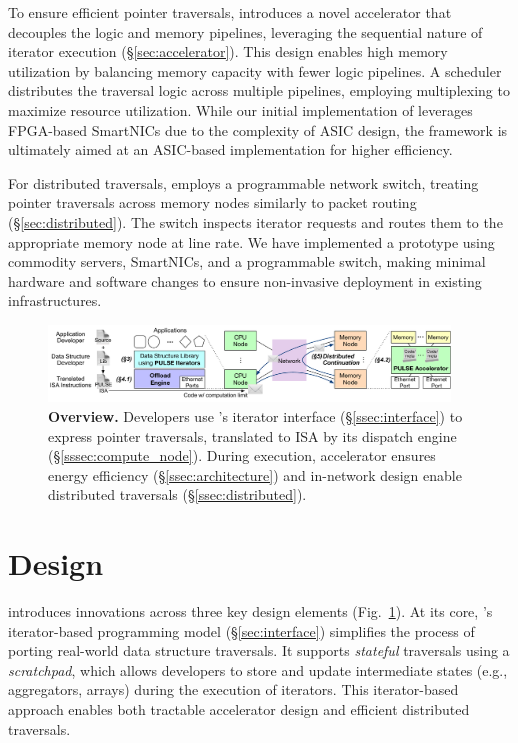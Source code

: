 To ensure efficient pointer traversals, \pulse introduces a novel accelerator that decouples the logic and memory pipelines, leveraging the sequential nature of iterator execution (\S\ref{sec:accelerator}). This design enables high memory utilization by balancing memory capacity with fewer logic pipelines. A scheduler distributes the traversal logic across multiple pipelines, employing multiplexing to maximize resource utilization. While our initial implementation of \pulse leverages FPGA-based SmartNICs due to the complexity of ASIC design, the framework is ultimately aimed at an ASIC-based implementation for higher efficiency.

For distributed traversals, \pulse employs a programmable network switch, treating pointer traversals across memory nodes similarly to packet routing (\S\ref{sec:distributed}). The switch inspects iterator requests and routes them to the appropriate memory node at line rate. We have implemented a prototype using commodity servers, SmartNICs, and a programmable switch, making minimal hardware and software changes to ensure non-invasive deployment in existing infrastructures.






\begin{figure}[ht!]
  \centering
  \includegraphics[width=0.95\textwidth]{fig/pulse/overview.pdf}
  \caption[\pulse Overview]{\textbf{\pulse Overview.} Developers use \pulse's iterator interface (\S\ref{ssec:interface}) to express pointer traversals, translated to \pulse ISA by its dispatch engine (\S\ref{sssec:compute_node}). During execution, \pulse accelerator ensures energy efficiency (\S\ref{ssec:architecture}) and in-network design enable distributed traversals (\S\ref{ssec:distributed}).} 
  \label{fig:general}
\end{figure}


\section{\pulse Design}
\label{sec:pulsedesign}
\pulse introduces innovations across three key design elements (Fig.~\ref{fig:general}). At its core, \pulse's iterator-based programming model (\S\ref{sec:interface}) simplifies the process of porting real-world data structure traversals. It supports \emph{stateful} traversals using a \emph{scratchpad}, which allows developers to store and update intermediate states (e.g., aggregators, arrays) during the execution of iterators. This iterator-based approach enables both tractable accelerator design and efficient distributed traversals.

